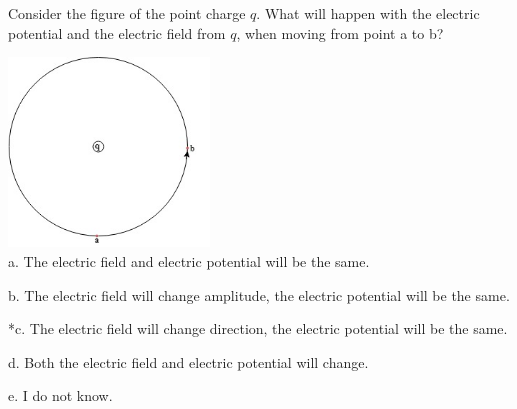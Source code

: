 
Consider the figure of the point charge \(q\). What will happen with the electric potential and the electric field from \(q\), when moving from point a to b?

\includegraphics[width=2.10872in,height=1.98205in]{../../Images/FieldsEBHQ1.png}\\

a. The electric field and electric potential will be the same.

b. The electric field will change amplitude, the electric potential will be the same.

*c. The electric field will change direction, the electric potential will be the same.

d. Both the electric field and electric potential will change.

e. I do not know.\\
